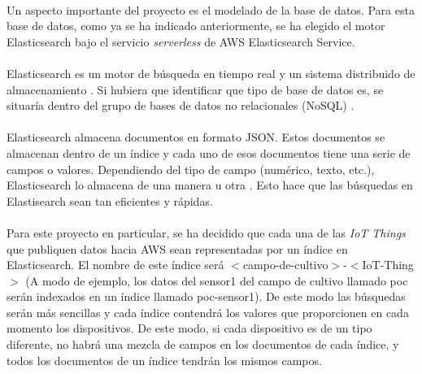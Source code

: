 \documentclass[../../memoria.tex]{subfiles}
\begin{document}
\paragraph{}
Un aspecto importante del proyecto es el modelado de la base de datos. Para esta base de datos, como ya se ha indicado anteriormente, se ha elegido el motor Elasticsearch bajo el servicio \textit{serverless} de AWS Elasticsearch Service.

\paragraph{}
Elasticsearch es un motor de búsqueda en tiempo real y un sistema distribuido de almacenamiento \cite{elastic}. Si hubiera que identificar que tipo de base de datos es, se situaría dentro del grupo de bases de datos no relacionales (NoSQL) \cite{nosql}.

\paragraph{}
Elasticsearch almacena documentos en formato JSON. Estos documentos se almacenan dentro de un índice y cada uno de esos documentos tiene una serie de campos o valores. Dependiendo del tipo de campo (numérico, texto, etc.), Elasticsearch lo almacena de una manera u otra \cite{elasticdata}. Esto hace que las búsquedas en Elastisearch sean tan eficientes y rápidas.

\paragraph{}
Para este proyecto en particular, se ha decidido que cada una de las \textit{IoT Things} que publiquen datos hacia AWS sean representadas por un índice en Elasticsearch. El nombre de este índice será $<$campo-de-cultivo$>$-$<$IoT-Thing$>$ (A modo de ejemplo, los datos del sensor1 del campo de cultivo llamado poc serán indexados en un índice llamado poc-sensor1). De este modo las búsquedas serán más sencillas y cada índice contendrá los valores que proporcionen en cada momento los dispositivos. De este modo, si cada dispositivo es de un tipo diferente, no habrá una mezcla de campos en los documentos de cada índice, y todos los documentos de un índice tendrán los mismos campos.
\end{document}
